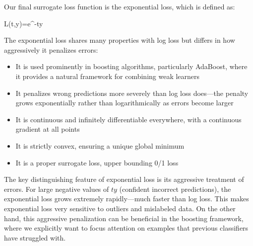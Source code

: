 Our final surrogate loss function is the \alert{exponential loss}, which is defined as:
\begin{myequation}
L(t,y)=e^{-ty}
\end{myequation}

The exponential loss shares many properties with log loss but differs in how aggressively it penalizes errors:
\begin{itemize} 
\item It is used prominently in boosting algorithms, particularly AdaBoost, where it provides a natural framework for combining weak learners
\item It penalizes wrong predictions more severely than log loss does—the penalty grows exponentially rather than logarithmically as errors become larger
\item It is continuous and infinitely differentiable everywhere, with a continuous gradient at all points
\item It is strictly convex, ensuring a unique global minimum
\item It is a proper surrogate loss, upper bounding 0/1 loss
\end{itemize}

The key distinguishing feature of exponential loss is its aggressive treatment of errors. For large negative values of $ty$ (confident incorrect predictions), the exponential loss grows extremely rapidly—much faster than log loss. This makes exponential loss very sensitive to outliers and mislabeled data. On the other hand, this aggressive penalization can be beneficial in the boosting framework, where we explicitly want to focus attention on examples that previous classifiers have struggled with.

\begin{center}
\end{center}

